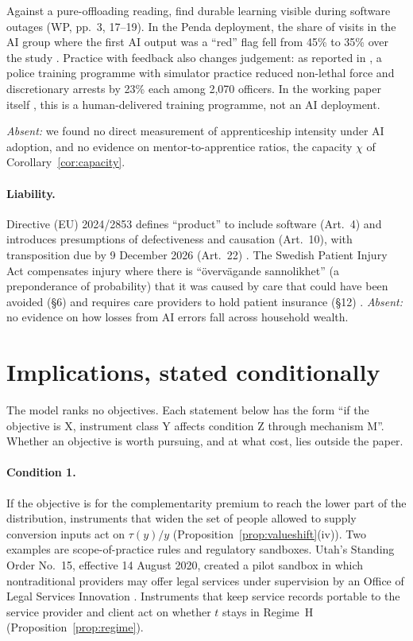 \documentclass[12pt]{article}
\theoremstyle{remark}
\begin{document}
Against a pure-offloading reading, \citet{brynjolfsson2025work} find durable learning visible during software outages (WP, pp.~3, 17--19). In the Penda deployment, the share of visits in the AI group where the first AI output was a ``red'' flag fell from 45\% to 35\% over the study \citep[p.~18]{korom2025penda}. Practice with feedback also changes judgement: as reported in \citet[p.~288]{ludwig2026reflective}, a police training programme with simulator practice reduced non-lethal force and discretionary arrests by 23\% each among 2,070 officers. In the working paper itself \citep[pp.~5, 31--32]{dube2025policing}, this is a human-delivered training programme, not an AI deployment.

\emph{Absent:} we found no direct measurement of apprenticeship intensity under AI adoption, and no evidence on mentor-to-apprentice ratios, the capacity $\chi$ of Corollary~\ref{cor:capacity}.

\paragraph{Liability.} Directive (EU) 2024/2853 defines ``product'' to include software (Art.~4) and introduces presumptions of defectiveness and causation (Art.~10), with transposition due by 9 December 2026 (Art.~22) \citep{eu2024pld}. The Swedish Patient Injury Act compensates injury where there is ``övervägande sannolikhet'' (a preponderance of probability) that it was caused by care that could have been avoided (§6) and requires care providers to hold patient insurance (§12) \citep{sweden1996patient}. \emph{Absent:} no evidence on how losses from AI errors fall across household wealth.

\section{Implications, stated conditionally}\label{sec:implications}

The model ranks no objectives. Each statement below has the form ``if the objective is X, instrument class Y affects condition Z through mechanism M''. Whether an objective is worth pursuing, and at what cost, lies outside the paper.

\paragraph{Condition 1.} If the objective is for the complementarity premium to reach the lower part of the distribution, instruments that widen the set of people allowed to supply conversion inputs act on $\tau(y)/y$ (Proposition~\ref{prop:valueshift}(iv)). Two examples are scope-of-practice rules and regulatory sandboxes. Utah's Standing Order No.~15, effective 14 August 2020, created a pilot sandbox in which nontraditional providers may offer legal services under supervision by an Office of Legal Services Innovation \citep{utah2020so15}. Instruments that keep service records portable to the service provider and client act on whether $t$ stays in Regime~H (Proposition~\ref{prop:regime}).
\end{document}

